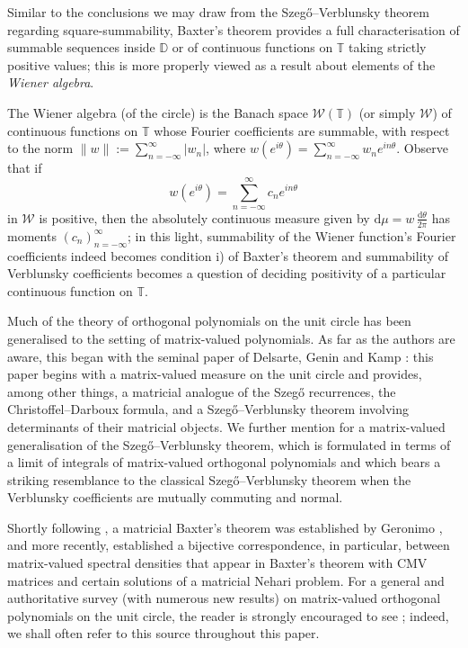 \documentclass[11pt,reqno]{amsart}
\def\th{\theta}
\def\rmd{\mathrm{d}}
\def\DD{\mathbb{D}}
\def\TT{\mathbb{T}}
\theoremstyle{definition}
\numberwithin{equation}{section}
\begin{document}
Similar to the conclusions we may draw from the Szeg\H{o}--Verblunsky theorem regarding square-summability, Baxter's theorem provides a full characterisation of summable sequences inside \(\DD\) or of continuous functions on \(\TT\) taking strictly positive values; this is more properly viewed as a result about elements of the \emph{Wiener algebra}.

The Wiener algebra (of the circle) is the Banach space \(\mathscr{W}(\TT)\) (or simply \(\mathscr{W}\)) of continuous functions on \(\TT\) whose Fourier coefficients are summable, with respect to the norm $\| w \| := \sum_{n=-\infty}^{\infty} |w_n|$, where $w(e^{i\theta}) = \sum_{n=-\infty}^{\infty} w_n e^{i n \theta}$. Observe that if
\[
    w(e^{i\th}) = \sum_{n=-\infty}^{\infty} c_n e^{in\th}
\]
in \(\mathscr{W}\) is positive, then the absolutely continuous measure given by \(\rmd\mu = w \, \frac{\rmd\th}{2\pi}\) has moments \((c_n)_{n=-\infty}^{\infty}\); in this light, summability of the Wiener function's Fourier coefficients indeed becomes condition i) of Baxter's theorem and summability of Verblunsky coefficients becomes a question of deciding positivity of a particular continuous function on \(\TT\).

Much of the theory of orthogonal polynomials on the unit circle has been generalised to the setting of matrix-valued polynomials. As far as the authors are aware, this began with the seminal paper of Delsarte, Genin and Kamp \cite{DGK78}: this paper begins with a matrix-valued measure on the unit circle and provides, among other things, a matricial analogue of the Szeg\H{o} recurrences, the Christoffel--Darboux formula, and a Szeg\H{o}--Verblunsky theorem involving determinants of their matricial objects. We further mention \cite{DHKT11} for a matrix-valued generalisation of the Szeg\H{o}--Verblunsky theorem, which is formulated in terms of a limit of integrals of matrix-valued orthogonal polynomials and which bears a striking resemblance to the classical Szeg\H{o}--Verblunsky theorem when the Verblunsky coefficients are mutually commuting and normal. 

Shortly following \cite{DGK78}, a matricial Baxter's theorem was established by Geronimo \cite{Ger81}, and more recently, \cite{DK16} established a bijective correspondence, in particular, between matrix-valued spectral densities that appear in Baxter's theorem with CMV matrices and certain solutions of a matricial Nehari problem. For a general and authoritative survey (with numerous new results) on matrix-valued orthogonal polynomials on the unit circle, the reader is strongly encouraged to see \cite{DPS08}; indeed, we shall often refer to this source throughout this paper.
\end{document}
